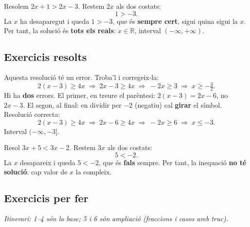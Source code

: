 \begin{exemple}
Resolem $2x+1>2x-3$. Restem $2x$ als dos costats:
\[
1>-3.
\]
La $x$ ha desaparegut i queda $1>-3$, que és \textbf{sempre cert}, sigui quina sigui
la $x$. Per tant, la solució és \textbf{tots els reals}: $x\in\mathbb{R}$, interval
$(-\infty,+\infty)$.
\end{exemple}

\subsection{Exercicis resolts}

\begin{exresolt}
Aquesta resolució té un error. Troba'l i corregeix-la:
\[
2(x-3)\ge 4x \;\Rightarrow\; 2x-3\ge 4x \;\Rightarrow\; -2x\ge 3 \;\Rightarrow\; x\ge -\tfrac{3}{2}.
\]
\solucio
Hi ha \textbf{dos} errors. El primer, en treure el parèntesi: $2(x-3)=2x-6$, no
$2x-3$. El segon, al final: en dividir per $-2$ (negatiu) cal \textbf{girar} el
símbol. Resolució correcta:
\[
2(x-3)\ge 4x \;\Rightarrow\; 2x-6\ge 4x \;\Rightarrow\; -2x\ge 6 \;\Rightarrow\; x\le -3.
\]
Interval $(-\infty,-3]$.
\end{exresolt}

\begin{exresolt}
Resol $3x+5<3x-2$.
\solucio
Restem $3x$ als dos costats:
\[
5<-2.
\]
La $x$ desapareix i queda $5<-2$, que és \textbf{fals} sempre. Per tant, la inequació
\textbf{no té solució}: cap valor de $x$ la compleix.
\end{exresolt}

\subsection{Exercicis per fer}

\noindent\textit{Itinerari: 1–4 són la base; 5 i 6 són ampliació (fraccions i casos
amb truc).}


